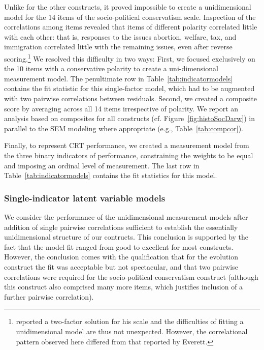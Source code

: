\documentclass[fignum,man]{apa}\usepackage[]{graphicx}\usepackage[]{color}
\begin{document}
Unlike for the other constructs, it proved impossible to create a unidimensional 
model for the 14 items of the socio-political conservatism scale.
Inspection of the correlations among
items revealed that items of different polarity correlated little with each
other: that is, responses to the issues abortion, welfare, tax, and immigration
correlated little with the remaining issues, even after reverse 
scoring.\footnote{  reported a two-factor solution for his 
	scale and the difficulties of fitting a unidimensional model
	are thus not unexpected. However,
	the correlational pattern observed here differed from that reported by Everett.}  
We resolved this difficulty in two ways: First, we focused
exclusively on the 10 items
with a conservative polarity to create 
a uni-dimensional measurement model.
The penultimate row in Table~\ref{tab:indicatormodels} contains the
fit statistic for this single-factor model, which 
had to be augmented with two pairwise correlations between residuals.
Second, 
  we created a composite score by averaging across all 
  14 items irrespective of polarity. 
  We report an analysis based on composites for all constructs (cf. Figure~\ref{fig:histoSocDarw}) 
  in parallel to the SEM modeling where appropriate (e.g., Table~\ref{tab:compcor}).
  
Finally, to represent CRT performance, we created 
a measurement model from the three  
binary indicators of performance, 
constraining the weights to be equal and
imposing an ordinal level of measurement. 
The last row in Table~\ref{tab:indicatormodels} contains the
fit statistics for this model. 

\subsubsection{Single-indicator latent variable models}
We consider the performance of the unidimensional measurement models 
after addition of single pairwise
correlations sufficient to establish the essentially 
unidimensional structure
of our contructs. This conclusion is supported by the
fact that the model fit ranged from good to excellent \cite{Hooper08}
for most constructs. However, the conclusion 
 comes with the qualification that for the evolution
construct the fit was acceptable but not spectacular, and that two pairwise
correlations were required for the socio-political conservatism construct (although this construct
also comprised many more items, which justifies inclusion of a further pairwise correlation). 
\end{document}
